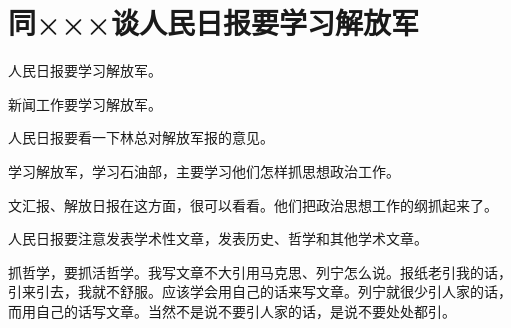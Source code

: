 \section[同×××谈人民日报要学习解放军（一九六四年一月八日）]{同×××谈人民日报要学习解放军}


人民日报要学习解放军。

新闻工作要学习解放军。

人民日报要看一下林总对解放军报的意见。

学习解放军，学习石油部，主要学习他们怎样抓思想政治工作。

文汇报、解放日报在这方面，很可以看看。他们把政治思想工作的纲抓起来了。

人民日报要注意发表学术性文章，发表历史、哲学和其他学术文章。

抓哲学，要抓活哲学。我写文章不大引用马克思、列宁怎么说。报纸老引我的话，引来引去，我就不舒服。应该学会用自己的话来写文章。列宁就很少引人家的话，而用自己的话写文章。当然不是说不要引人家的话，是说不要处处都引。


